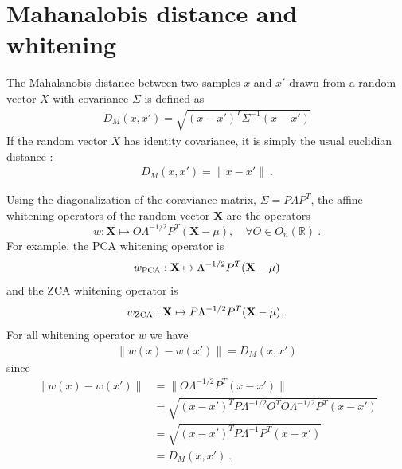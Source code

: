 \documentclass{article} %
\begin{document}

{}

\newpage

\appendix

\section{Mahanalobis distance and whitening}

The Mahalanobis distance \citep{chandra1936generalised, mclachlan1999mahalanobis} between two samples $x$ and $x'$ drawn from a random vector $X$ with covariance $\Sigma$ is defined as  
\begin{align*} D_M (x, x' ) =  \sqrt{ (x - x')^T \Sigma^{-1} (x - x')} \end{align*}
If the random vector $X$ has identity covariance, it is simply the usual euclidian distance : 
\begin{align*} D_M (x, x' ) =  \| x - x' \| \ .\end{align*}

Using the diagonalization of the coraviance matrix,  $\Sigma = P\Lambda P^T$, the affine whitening operators of the random vector $\mathbf{X}$ are the operators 
\begin{equation}
\label{whitening}
     w : \mathbf{X} \mapsto O \Lambda^{-1/2} P^T (\mathbf{X} - \mu), \quad \forall O \in  O_n (\mathbb{R}) \ .
\end{equation}
For example, the PCA whitening operator is 
\begin{equation*}
     w_{\rm PCA} : \mathbf{X} \mapsto \Lambda^{-1/2} P^T (\mathbf{X} - \mu)
\end{equation*}
and the ZCA whitening operator is 
\begin{equation*}
     w_{\rm ZCA} : \mathbf{X} \mapsto P \Lambda^{-1/2} P^T (\mathbf{X} - \mu) \ .
\end{equation*}
For all whitening operator $w$ we have
\begin{align*}
\|w(x) - w(x')\| = D_M(x, x')
\end{align*}
since
\begin{align*}
  \|w(x) - w(x')\|
    &= \| O \Lambda^{-1/2} P^T ( x - x') \|\\
    &= \sqrt{(x - x')^T P \Lambda^{-1/2} O^T O \Lambda^{-1/2} P^T (x - x') }\\
    &=  \sqrt{ (x - x')^T P \Lambda^{-1} P^T (x - x')} \\
    &= D_M(x, x') \ .
\end{align*}
\end{document}
